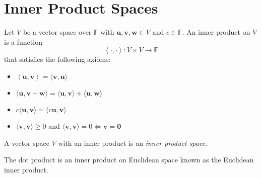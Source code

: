 \section{Inner Product Spaces}
\begin{definition}
    Let \(V\) be a vector space over \(\mathbb{F} \) with \(\mathbf{u} ,\mathbf{v} ,\mathbf{w} \in V\) and \(c\in\mathbb{F}\). An inner product on \(V\) is a function
    \[
        \left\langle \cdot,\cdot \right\rangle :V\times V\to \mathbb{F} 
    \]
    that satisfies the following axioms:
    \begin{itemize}
        \item \(\left\langle \mathbf{u} ,\mathbf{v}  \right\rangle =\langle \mathbf{v} ,\mathbf{u}  \rangle \)
        \item \(\langle \mathbf{u} ,\mathbf{v} +\mathbf{w}  \rangle=\langle \mathbf{u} ,\mathbf{v}  \rangle+\langle \mathbf{u} ,\mathbf{w}  \rangle   \)
        \item \(c\langle \mathbf{u} ,\mathbf{v}  \rangle=\langle c \mathbf{u} ,\mathbf{v}  \rangle  \)
        \item \(\langle \mathbf{v} ,\mathbf{v}  \rangle\geq 0 \) and \(\langle \mathbf{v} ,\mathbf{v}  \rangle=0 \iff \mathbf{v} =\mathbf{0}  \)
    \end{itemize}
    A vector space \(V\) with an inner product is an \emph{inner product space.}
\end{definition}
    The dot product is an inner product on Euclidean space known as the Euclidean inner product.
